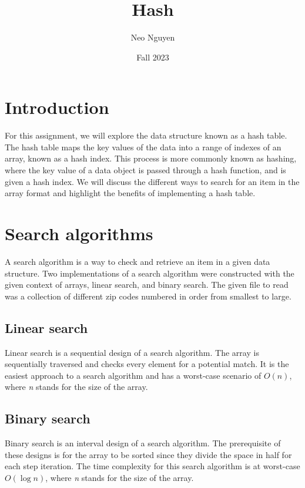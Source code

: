 \documentclass[a4paper,11pt]{article}
\begin{document}
\title{
    \textbf{Hash}
}
\author{Neo Nguyen}
\date{Fall 2023}

\maketitle

\section*{Introduction}

    For this assignment, we will explore the data structure known as a hash table. The hash table maps the key values of the data into a range of indexes of an array, known as a hash index. This process is more commonly known as hashing, where the key value of a data object is passed through a hash function, and is given a hash index. We will discuss the different ways to search for an item in the array format and highlight the benefits of implementing a hash table.
    
\section*{Search algorithms}

    A search algorithm is a way to check and retrieve an item in a given data structure. Two implementations of a search algorithm were constructed with the given context of arrays, linear search, and binary search. The given file to read was a collection of different zip codes numbered in order from smallest to large.

    \subsection*{Linear search}

        Linear search is a sequential design of a search algorithm. The array is sequentially traversed and checks every element for a potential match. It is the easiest approach to a search algorithm and has a worst-case scenario of $O(n)$, where \textit{n} stands for the size of the array.
        
    \subsection*{Binary search}

        Binary search is an interval design of a search algorithm. The prerequisite of these designs is for the array to be sorted since they divide the space in half for each step iteration. The time complexity for this search algorithm is at worst-case $O(\log n)$, where \textit{n} stands for the size of the array. 
        
\end{document}
